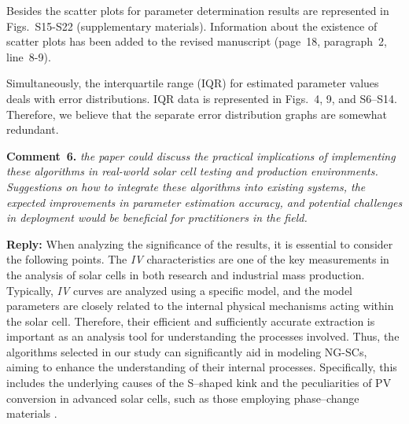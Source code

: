 \documentclass[a4paper,fleqn]{cas-sc}
\begin{document}
Besides the scatter plots for parameter determination results are represented in Figs.~S15-S22 (supplementary materials).
Information about the existence of scatter plots has been added to the revised manuscript 
(page~18, paragraph~2, line~8-9).

Simultaneously, the interquartile range (IQR) for estimated parameter values deals with error distributions.
IQR data is represented in Figs.~4, 9, and S6--S14.
Therefore, we believe that the separate error distribution graphs are somewhat redundant.


\vspace{1cm}
\noindent
\textcolor[rgb]{0.00,0.50,1.00}{\textbf{Comment~6.}}
\emph{ the paper could discuss the practical implications of implementing these algorithms
in real-world solar cell testing and production environments.
Suggestions on how to integrate these algorithms into existing systems, the expected improvements
in parameter estimation accuracy, and potential challenges in deployment would be beneficial for practitioners in the field.}

\noindent
\textcolor[rgb]{0.51,0.00,0.00}{\textbf{Reply:}}
When analyzing the significance of the results, it is essential to consider the following points.
The \emph{IV} characteristics are one of the key measurements  in the analysis
of solar cells in both research and industrial mass production.
Typically, \emph{IV} curves are analyzed using a specific model,
and the model parameters are closely related to the internal physical mechanisms acting within the solar cell.
Therefore, their efficient and sufficiently accurate extraction is important
as an analysis tool for understanding the processes involved.
Thus, the algorithms selected in our study can significantly aid in modeling NG-SCs,
aiming to enhance the understanding of their internal processes.
Specifically, this includes the underlying causes of the S--shaped kink
and the peculiarities of PV conversion in advanced solar cells, such as those employing phase--change materials \cite{Zhu2024,Zhu2023}.
\end{document}
